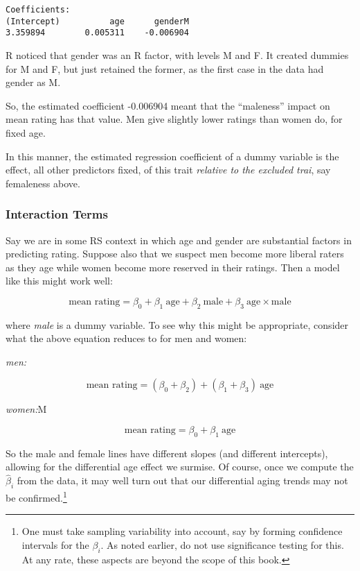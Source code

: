 \begin{lstlisting}
Coefficients:
(Intercept)          age      genderM  
3.359894        0.005311    -0.006904  
\end{lstlisting}

R noticed that gender was an R factor, with levels M and F.  It created
dummies for M and F, but just retained the former, as the first case in
the data had gender as M.

So, the estimated coefficient -0.006904 meant that the ``maleness''
impact on mean rating has that value.  Men give slightly lower
ratings than women do, for fixed age.

In this manner, the estimated regression coefficient of a dummy variable
is the effect, all other predictors fixed, of this trait
\textit{relative to the excluded trai}, say femaleness above.

\subsubsection{Interaction Terms}

Say we are in some RS context in which age and gender are substantial
factors in predicting rating.  Suppose also that we suspect men become
more liberal raters as they age while women become more reserved in
their ratings.  Then a model like this might work well:

\begin{equation}
\label{mfinteraction}
\textrm{mean rating} = \beta_0 + \beta_1 ~ \textrm{age} + 
\beta_2 ~ \textrm{male} +
\beta_3 ~ \textrm{age} \times \textrm{male}
\end{equation}

where \textit{male} is a dummy variable.  To see why this might be
appropriate, consider what the above equation reduces to for men and
women:

\textit{men:}

\begin{equation}
\textrm{mean rating} 
= (\beta_0+\beta_2) + (\beta_1+\beta_3) ~ \textrm{age} 
\end{equation}

\textit{women:}M

\begin{equation}
\textrm{mean rating} = \beta_0 + \beta_1 ~ \textrm{age} 
\end{equation}

So the male and female lines have different slopes (and different
intercepts), allowing for the differential age effect we surmise.
Of course, once we compute the $\widehat{\beta}_i$ from the data, it
may well turn out that our differential aging trends may not be
confirmed.\footnote{One must take sampling variability into account, say
by forming confidence intervals for the $\beta_i$.  As noted earlier, do
not use significance testing for this.  At any rate, these aspects are
beyond the scope of this book.}

